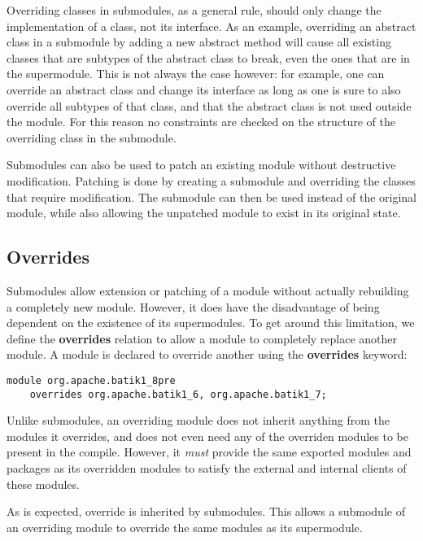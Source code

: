 Overriding classes in submodules, as a general rule, should only change the implementation 
of a class, not its interface. As an example, overriding an abstract class in a submodule by adding
a new abstract method will cause all existing classes that are subtypes of the 
abstract class to break, even the ones that are in the supermodule. This is not always
the case however: for example, one can override an abstract class and change its interface
as long as one is sure to also override all subtypes of that class, and that the
abstract class is not used outside the module. For this reason no constraints are checked
on the structure of the overriding class in the submodule.

Submodules can also be used to patch an existing module without
destructive modification. Patching is done by creating a submodule
and overriding the classes that require modification. The submodule can
then be used instead of the original module, while also allowing the
unpatched module to exist in its original state.

\subsection{Overrides}

Submodules allow extension or patching of a module without actually
rebuilding a completely new module. However, it does have the disadvantage
of being dependent on the existence of its supermodules. To get
around this limitation, we define the \textbf{overrides} relation to allow
a module to completely replace another module. A module is declared
to override another using the \textbf{overrides} keyword:

\begin{lstlisting}
module org.apache.batik1_8pre 
	overrides org.apache.batik1_6, org.apache.batik1_7;
\end{lstlisting}

Unlike submodules, an overriding module does not inherit anything from the
modules it overrides, and does not even need any of the overriden modules to
be present in the compile. However, it \textit{must} provide the same exported modules
and packages as its overridden modules to satisfy the external and internal
clients of these modules. 

As is expected, override is inherited by submodules. This allows a submodule
of an overriding module to override the same modules as its supermodule.

